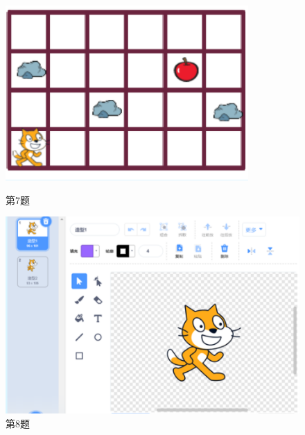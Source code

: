 \documentclass[10.5pt, a4paper]{article}
\begin{document}
\begin{enumerate}
        \begin{figure}[htbp]
            \centering
            \begin{minipage}[t]{.2\textwidth}
                \centering
                \includegraphics[width=\textwidth]{7.png}
                \caption*{第7题}
            \end{minipage}
            \begin{minipage}[t]{.21\textwidth}
                \centering
                \includegraphics[width=\textwidth]{8.png}
                \caption*{第8题}
            \end{minipage}
            \begin{minipage}[t]{.2\textwidth}
                \centering

\end{minipage}
\end{figure}
\end{enumerate}
\end{document}
